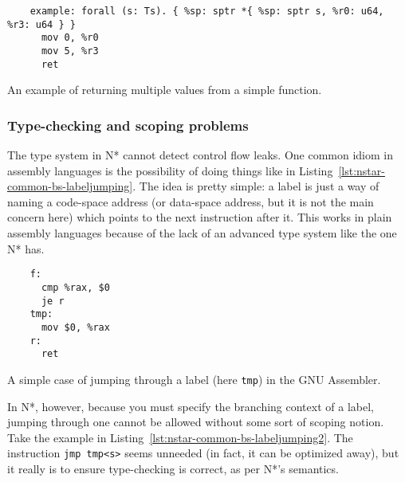 \begin{listing}[htb]
  \centering
  \begin{minipage}{0.90\textwidth}
    \begin{verbatim}
    example: forall (s: Ts). { %sp: sptr *{ %sp: sptr s, %r0: u64, %r3: u64 } }
      mov 0, %r0
      mov 5, %r3
      ret
    \end{verbatim}
  \end{minipage}
  \caption{An example of returning multiple values from a simple function.}
  \label{lst:nstar-common-bs-returnvalues}
\end{listing}

\subsubsection{Type-checking and scoping problems}\label{subsubsec:nstar-common-bs-restrictions-tcscopes}

The type system in N* cannot detect control flow leaks.
One common idiom in assembly languages is the possibility of doing things like in Listing~\ref{lst:nstar-common-bs-labeljumping}.
The idea is pretty simple: a label is just a way of naming a code-space address (or data-space address, but it is not the main concern here) which points to the next instruction after it.
This works in plain assembly languages because of the lack of an advanced type system like the one N* has.

\begin{listing}[htb]
  \centering
  \begin{minipage}{0.90\textwidth}
    \begin{verbatim}
    f:
      cmp %rax, $0
      je r
    tmp:
      mov $0, %rax
    r:
      ret
    \end{verbatim}
  \end{minipage}
  \caption{A simple case of jumping through a label (here \texttt{tmp}) in the GNU Assembler.}
  \label{lst:nstar-common-bs-labeljumping}
\end{listing}

In N*, however, because you must specify the branching context of a label, jumping through one cannot be allowed without some sort of scoping notion.
Take the example in Listing~\ref{lst:nstar-common-bs-labeljumping2}.
The instruction \texttt{jmp tmp<s>} seems unneeded (in fact, it can be optimized away), but it really is to ensure type-checking is correct, as per N*'s semantics.


